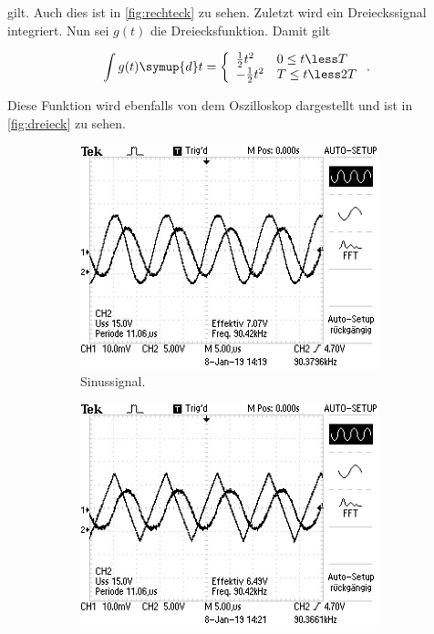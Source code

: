 gilt. Auch dies ist in \autoref{fig:rechteck} zu sehen.
Zuletzt wird ein Dreieckssignal integriert. Nun sei $g(t)$ die Dreiecksfunktion. Damit gilt

\begin{equation}
    \int g(t) \symup{d}t = \left\{\begin{array}{ll}
    \frac{1}{2} t^2 & 0 \leq t \less T \\
    -\frac{1}{2} t^2 & T \leq t \less 2T \\
    \end{array}
    \right.
    .
\end{equation}

Diese Funktion wird ebenfalls von dem Oszilloskop dargestellt und ist in \autoref{fig:dreieck} zu sehen.

\begin{figure}
    \centering
    \begin{subfigure}{0.32\textwidth}
        \centering
        \includegraphics[width=0.95\textwidth]{content/sinus.jpg}
        \caption{Sinussignal.}
        \label{fig:sinus}
    \end{subfigure}
    \begin{subfigure}{0.32\textwidth}
        \centering
        \includegraphics[width=0.95\textwidth]{content/dreieck.jpg}

\end{subfigure}
\end{figure}
